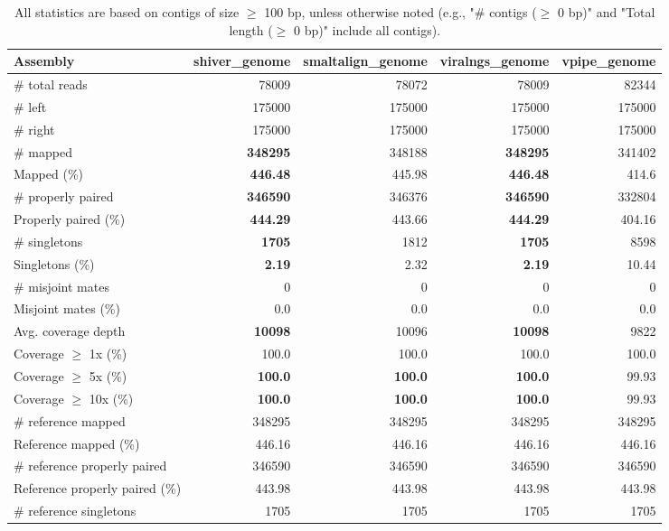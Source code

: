 \documentclass[12pt,a4paper]{article}
\begin{document}
\begin{table}[ht]
\begin{center}
\caption{All statistics are based on contigs of size $\geq$ 100 bp, unless otherwise noted (e.g., "\# contigs ($\geq$ 0 bp)" and "Total length ($\geq$ 0 bp)" include all contigs).}
\begin{tabular}{|l*{4}{|r}|}
\hline
Assembly & shiver\_genome & smaltalign\_genome & viralngs\_genome & vpipe\_genome \\ \hline
\# total reads & 78009 & 78072 & 78009 & 82344 \\ \hline
\# left & 175000 & 175000 & 175000 & 175000 \\ \hline
\# right & 175000 & 175000 & 175000 & 175000 \\ \hline
\# mapped & {\bf 348295} & 348188 & {\bf 348295} & 341402 \\ \hline
Mapped (\%) & {\bf 446.48} & 445.98 & {\bf 446.48} & 414.6 \\ \hline
\# properly paired & {\bf 346590} & 346376 & {\bf 346590} & 332804 \\ \hline
Properly paired (\%) & {\bf 444.29} & 443.66 & {\bf 444.29} & 404.16 \\ \hline
\# singletons & {\bf 1705} & 1812 & {\bf 1705} & 8598 \\ \hline
Singletons (\%) & {\bf 2.19} & 2.32 & {\bf 2.19} & 10.44 \\ \hline
\# misjoint mates & 0 & 0 & 0 & 0 \\ \hline
Misjoint mates (\%) & 0.0 & 0.0 & 0.0 & 0.0 \\ \hline
Avg. coverage depth & {\bf 10098} & 10096 & {\bf 10098} & 9822 \\ \hline
Coverage $\geq$ 1x (\%) & 100.0 & 100.0 & 100.0 & 100.0 \\ \hline
Coverage $\geq$ 5x (\%) & {\bf 100.0} & {\bf 100.0} & {\bf 100.0} & 99.93 \\ \hline
Coverage $\geq$ 10x (\%) & {\bf 100.0} & {\bf 100.0} & {\bf 100.0} & 99.93 \\ \hline
\# reference mapped & 348295 & 348295 & 348295 & 348295 \\ \hline
Reference mapped (\%) & 446.16 & 446.16 & 446.16 & 446.16 \\ \hline
\# reference properly paired & 346590 & 346590 & 346590 & 346590 \\ \hline
Reference properly paired (\%) & 443.98 & 443.98 & 443.98 & 443.98 \\ \hline
\# reference singletons & 1705 & 1705 & 1705 & 1705 \\ \hline

\end{tabular}
\end{center}
\end{table}
\end{document}
